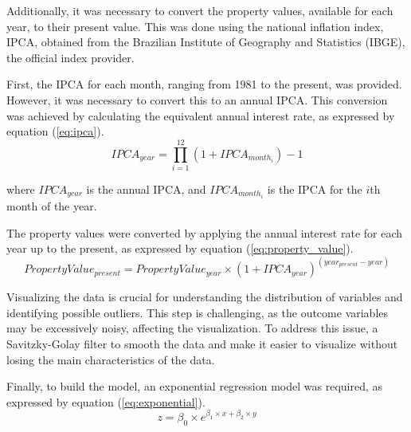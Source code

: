 \documentclass[12pt]{gsis} %
\begin{document}

Additionally, it was necessary to convert the property values, available for each year, to their present value.
This was done using the national inflation index, IPCA, obtained from the Brazilian Institute of Geography and Statistics (IBGE), the official index provider.

First, the IPCA for each month, ranging from 1981 to the present, was provided.
However, it was necessary to convert this to an annual IPCA.
This conversion was achieved by calculating the equivalent annual interest rate, as expressed by equation (\ref{eq:ipca}).
%
\begin{equation}\label{eq:ipca}
	IPCA_{year} = \prod_{i=1}^{12} (1 + IPCA_{month_i}) - 1
\end{equation}

where $IPCA_{year}$ is the annual IPCA, and $IPCA_{month_i}$ is the IPCA for the $i$th month of the year.

The property values were converted by applying the annual interest rate for each year up to the present, as expressed by equation (\ref{eq:property_value}).
%
\begin{equation}\label{eq:property_value}
	PropertyValue_{present} = PropertyValue_{year} \times (1 + IPCA_{year})^{(year_{present} - year)}
\end{equation}


Visualizing the data is crucial for understanding the distribution of variables and identifying possible outliers.
This step is challenging, as the outcome variables may be excessively noisy, affecting the visualization.
To address this issue, a Savitzky-Golay filter \citep{savitzky1964smoothing} to smooth the data and make it easier to visualize without losing the main characteristics of the data.


Finally, to build the model, an exponential regression model was required, as expressed by equation (\ref{eq:exponential}).
%
\begin{equation}\label{eq:exponential}
	z = \beta_0 \times e^{\beta_1 \times x + \beta_2 \times y}
\end{equation}
\end{document}
